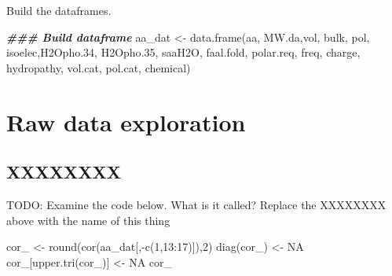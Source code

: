 \documentclass[
]{book}
\newenvironment{Shaded}{\begin{snugshade}}{\end{snugshade}}
\newcommand{\ConstantTok}[1]{\textcolor[rgb]{0.00,0.00,0.00}{#1}}
\newcommand{\DecValTok}[1]{\textcolor[rgb]{0.00,0.00,0.81}{#1}}
\newcommand{\DocumentationTok}[1]{\textcolor[rgb]{0.56,0.35,0.01}{\textbf{\textit{#1}}}}
\newcommand{\FloatTok}[1]{\textcolor[rgb]{0.00,0.00,0.81}{#1}}
\newcommand{\FunctionTok}[1]{\textcolor[rgb]{0.00,0.00,0.00}{#1}}
\newcommand{\NormalTok}[1]{#1}
\newcommand{\OtherTok}[1]{\textcolor[rgb]{0.56,0.35,0.01}{#1}}
\newcommand{\SpecialCharTok}[1]{\textcolor[rgb]{0.00,0.00,0.00}{#1}}
\begin{document}
Build the dataframes.

\begin{Shaded}
\begin{Highlighting}[]
\DocumentationTok{\#\#\# Build dataframe}
\NormalTok{aa\_dat }\OtherTok{\textless{}{-}} \FunctionTok{data.frame}\NormalTok{(aa, }
\NormalTok{                     MW.da,vol,}
\NormalTok{                     bulk, pol, }
\NormalTok{                     isoelec,H2Opho}\FloatTok{.34}\NormalTok{, H2Opho}\FloatTok{.35}\NormalTok{,}
\NormalTok{                     saaH2O, faal.fold, polar.req,}
\NormalTok{                     freq, charge, hydropathy,}
\NormalTok{                     vol.cat, pol.cat, chemical)}
\end{Highlighting}
\end{Shaded}

\hypertarget{raw-data-exploration}{%
\section{Raw data exploration}\label{raw-data-exploration}}

\hypertarget{xxxxxxxx}{%
\subsection{XXXXXXXX}\label{xxxxxxxx}}

TODO: Examine the code below. What is it called? Replace the XXXXXXXX above with the name of this thing

\begin{Shaded}
\begin{Highlighting}[]
\NormalTok{cor\_ }\OtherTok{\textless{}{-}} \FunctionTok{round}\NormalTok{(}\FunctionTok{cor}\NormalTok{(aa\_dat[,}\SpecialCharTok{{-}}\FunctionTok{c}\NormalTok{(}\DecValTok{1}\NormalTok{,}\DecValTok{13}\SpecialCharTok{:}\DecValTok{17}\NormalTok{)]),}\DecValTok{2}\NormalTok{)}
\FunctionTok{diag}\NormalTok{(cor\_) }\OtherTok{\textless{}{-}} \ConstantTok{NA}
\NormalTok{cor\_[}\FunctionTok{upper.tri}\NormalTok{(cor\_)] }\OtherTok{\textless{}{-}} \ConstantTok{NA}
\NormalTok{cor\_}
\end{Highlighting}
\end{Shaded}
\end{document}
